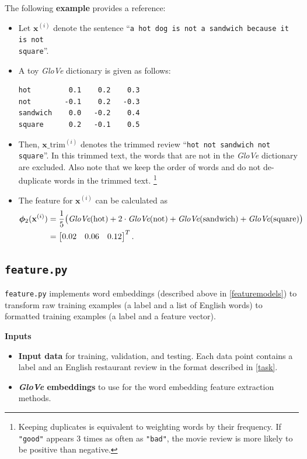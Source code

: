 \documentclass[11pt,addpoints,answers]{exam}
\newcommand{\xv}{\mathbf{x}}
\begin{document}
The following \textbf{example} provides a reference:

\begin{itemize}
    \item Let $\xv^{(i)}$ denote the sentence ``\texttt{a hot dog is not a sandwich because it is not\\ square}''.
    \item A toy \emph{GloVe} dictionary is given as follows: 
    \begin{lstlisting}
hot         0.1    0.2    0.3
not        -0.1    0.2   -0.3
sandwich    0.0   -0.2    0.4
square      0.2   -0.1    0.5
    \end{lstlisting}
    \item Then, $\xv\_\text{trim}^{(i)}$ denotes the trimmed review ``\texttt{hot not sandwich not square}''. In this trimmed text, the words that are not in the \emph{GloVe} dictionary are excluded. Also note that we keep the order of words and do not de-duplicate words in the trimmed text. \footnote{Keeping duplicates is equivalent to weighting words by their frequency. If \lstinline{"good"} appears 3 times as often as \lstinline{"bad"}, the movie review is more likely to be positive than negative.}
    \item The feature for $\xv^{(i)}$ can be calculated as
        \begin{align*} \boldsymbol{\phi}_2(\xv^{(i)}) &= \frac{1}{5}\big( \emph{GloVe}(\text{hot}) + 2 \cdot \emph{GloVe}(\text{not}) + \emph{GloVe}(\text{sandwich}) + \emph{GloVe}(\text{square}) \big) \\
        &= \begin{bmatrix} 0.02 & 0.06 & 0.12 \end{bmatrix}^T.
        \end{align*}
\end{itemize}

\subsection{\texttt{feature.py}}\label{featurepy}

\lstinline{feature.py} implements word embeddings (described above in \ref{featuremodels}) to transform raw training examples (a label and a list of English words) to formatted training examples (a label and a feature vector).

{\bf Inputs }
\begin{itemize}
    \item \textbf{Input data} for training, validation, and testing. Each data point contains a label and an English restaurant review in the format described in \ref{task}.
    \item \textbf{\emph{GloVe} embeddings} to use for the word embedding feature extraction methods.
\end{itemize}
\end{document}
